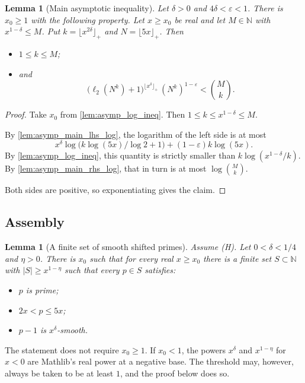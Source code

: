 \documentclass[11pt]{article}
\newtheorem{lemma}[theorem]{Lemma}
\theoremstyle{definition}
\theoremstyle{remark}
\newcommand{\floorp}[1]{\lfloor #1\rfloor_{+}}
\newcommand{\ltwo}{\ell_{2}}
\begin{document}
\begin{lemma}[Main asymptotic inequality]\label{lem:asymp_main}
Let $\delta>0$ and $4\delta<\varepsilon<1$. There is $x_0\ge1$ with the following property. Let $x\ge x_0$ be real and let $M\in\mathbb{N}$ with $x^{1-\delta}\le M$. Put $k=\floorp{x^{2\delta}}$ and $N=\floorp{5x}$. Then
\begin{itemize}
\item $1\le k\le M$;
\item and
\[
\bigl(\ltwo(N^k)+1\bigr)^{\floorp{x^\delta}}\,(N^k)^{1-\varepsilon}<\binom{M}{k}.
\]
\end{itemize}
\end{lemma}

\begin{proof}
Take $x_0$ from \cref{lem:asymp_log_ineq}. Then $1\le k\le x^{1-\delta}\le M$.

By \cref{lem:asymp_main_lhs_log}, the logarithm of the left side is at most
\[
x^\delta\log\bigl(k\log(5x)/\log2+1\bigr)+(1-\varepsilon)k\log(5x).
\]
By \cref{lem:asymp_log_ineq}, this quantity is strictly smaller than $k\log(x^{1-\delta}/k)$. By \cref{lem:asymp_main_rhs_log}, that in turn is at most $\log\binom Mk$.

Both sides are positive, so exponentiating gives the claim.
\end{proof}

\subsection{Assembly}

\begin{lemma}[A finite set of smooth shifted primes]\label{lem:exists_prime_finset}
Assume (H). Let $0<\delta<1/4$ and $\eta>0$. There is $x_0$ such that for every real $x\ge x_0$ there is a finite set $S\subset\mathbb{N}$ with $|S|\ge x^{1-\eta}$ such that every $p\in S$ satisfies:
\begin{itemize}
\item $p$ is prime;
\item $2x<p\le5x$;
\item $p-1$ is $x^\delta$-smooth.
\end{itemize}
\end{lemma}

The statement does not require $x_0\ge1$. If $x_0<1$, the powers $x^\delta$ and $x^{1-\eta}$ for $x<0$ are Mathlib's real power at a negative base. The threshold may, however, always be taken to be at least $1$, and the proof below does so.
\end{document}
